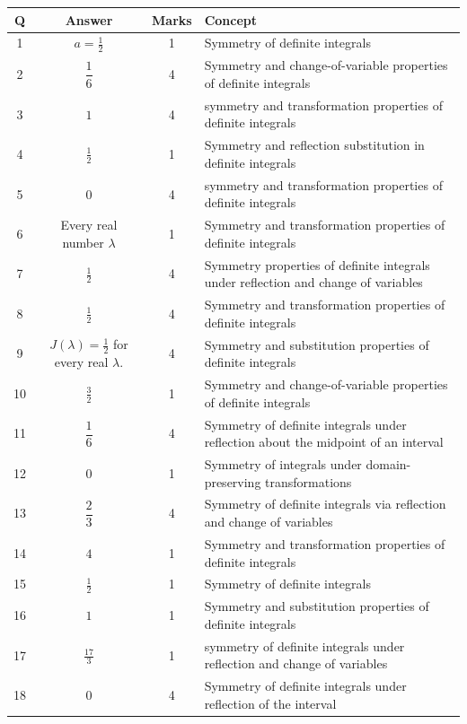 \documentclass[11pt,a4paper]{article}
\begin{document}
\noindent\begin{tabularx}{\linewidth}{|c|c|c|X|}\hline
\textbf{Q} & \textbf{Answer} & \textbf{Marks} & \textbf{Concept} \\\hline
1 & $a=\frac12$ & 1 & Symmetry of definite integrals \\\hline
2 & $\dfrac{1}{6}$ & 4 & Symmetry and change-of-variable properties of definite integrals \\\hline
3 & $1$ & 4 & symmetry and transformation properties of definite integrals \\\hline
4 & $\frac12$ & 1 & Symmetry and reflection substitution in definite integrals \\\hline
5 & $0$ & 4 & symmetry and transformation properties of definite integrals \\\hline
6 & Every real number $\lambda$ & 1 & Symmetry and transformation properties of definite integrals \\\hline
7 & $\frac12$ & 4 & Symmetry properties of definite integrals under reflection and change of variables \\\hline
8 & $\frac{1}{2}$ & 4 & Symmetry and transformation properties of definite integrals \\\hline
9 & \(J(\lambda)=\frac{1}{2}\) for every real \(\lambda\). & 4 & Symmetry and substitution properties of definite integrals \\\hline
10 & $\frac{3}{2}$ & 1 & Symmetry and change-of-variable properties of definite integrals \\\hline
11 & $\dfrac{1}{6}$ & 4 & Symmetry of definite integrals under reflection about the midpoint of an interval \\\hline
12 & \(0\) & 1 & Symmetry of integrals under domain-preserving transformations \\\hline
13 & $\dfrac{2}{3}$ & 4 & Symmetry of definite integrals via reflection and change of variables \\\hline
14 & $4$ & 1 & Symmetry and transformation properties of definite integrals \\\hline
15 & $\frac{1}{2}$ & 1 & Symmetry of definite integrals \\\hline
16 & $1$ & 1 & Symmetry and substitution properties of definite integrals \\\hline
17 & $\frac{17}{3}$ & 1 & symmetry of definite integrals under reflection and change of variables \\\hline
18 & $0$ & 4 & Symmetry of definite integrals under reflection of the interval \\\hline

\end{tabularx}
\end{document}
